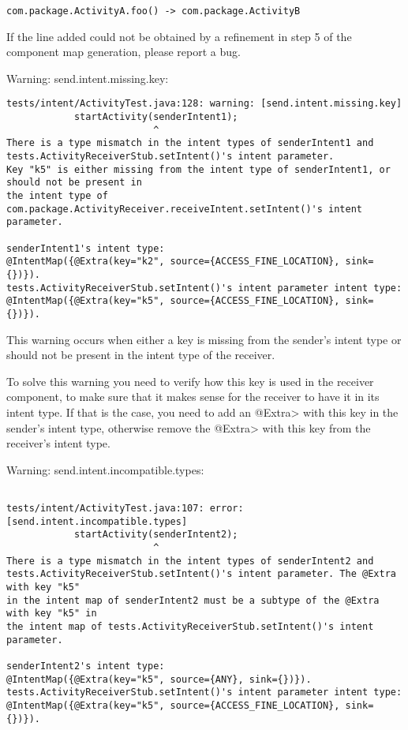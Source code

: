 \begin{Verbatim}
com.package.ActivityA.foo() -> com.package.ActivityB
\end{Verbatim}

If the line added could not be obtained by a refinement in step 5 of the
component map generation, please report a bug.

\bigskip
\noindent
Warning: send.intent.missing.key:

\begin{Verbatim}
tests/intent/ActivityTest.java:128: warning: [send.intent.missing.key] 
            startActivity(senderIntent1);
                          ^
There is a type mismatch in the intent types of senderIntent1 and
tests.ActivityReceiverStub.setIntent()'s intent parameter.
Key "k5" is either missing from the intent type of senderIntent1, or should not be present in
the intent type of com.package.ActivityReceiver.receiveIntent.setIntent()'s intent parameter.

senderIntent1's intent type:
@IntentMap({@Extra(key="k2", source={ACCESS_FINE_LOCATION}, sink={})}).
tests.ActivityReceiverStub.setIntent()'s intent parameter intent type:
@IntentMap({@Extra(key="k5", source={ACCESS_FINE_LOCATION}, sink={})}).
\end{Verbatim}

This warning occurs when either a key is missing from the sender's intent type
or should not be present in the intent type of the receiver.

To solve this warning you need to verify how this key is used in the receiver
component, to make sure that it makes sense for the receiver to have it in its
intent type. If that is the case, you need to add an \<@Extra> with this key in the
sender's intent type, otherwise remove the \<@Extra> with this key from the
receiver's intent type.

\bigskip
\noindent
Warning: send.intent.incompatible.types:

\begin{Verbatim}

tests/intent/ActivityTest.java:107: error: [send.intent.incompatible.types] 
            startActivity(senderIntent2);
                          ^
There is a type mismatch in the intent types of senderIntent2 and
tests.ActivityReceiverStub.setIntent()'s intent parameter. The @Extra with key "k5"
in the intent map of senderIntent2 must be a subtype of the @Extra with key "k5" in
the intent map of tests.ActivityReceiverStub.setIntent()'s intent parameter.

senderIntent2's intent type:
@IntentMap({@Extra(key="k5", source={ANY}, sink={})}).
tests.ActivityReceiverStub.setIntent()'s intent parameter intent type:
@IntentMap({@Extra(key="k5", source={ACCESS_FINE_LOCATION}, sink={})}).

\end{Verbatim}

